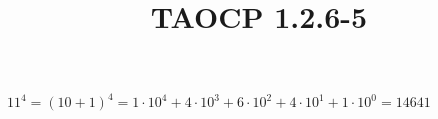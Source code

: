 \documentclass{article}
\title{TAOCP 1.2.6\mbox{-}5}
\begin{document}
\maketitle

\( 11^{4} = {(10+1)}^{4} = 1 \cdot 10^{4} + 4 \cdot 10^{3} + 6 \cdot 10^{2} + 4 \cdot 10^{1} + 1 \cdot 10^{0} = 14641 \)
\end{document}

